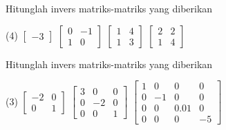 \begin{exercise}
Hitunglah invers matriks-matriks yang diberikan
\begin{tasks}(4)
\task
$\begin{bmatrix}
-3
\end{bmatrix}$
\task
$\begin{bmatrix}
0 & -1 \\
1 & 0
\end{bmatrix}$
\task
$\begin{bmatrix}
1 & 4 \\
1 & 3
\end{bmatrix}$
\task
$\begin{bmatrix}
2 & 2 \\
1 & 4
\end{bmatrix}$
\end{tasks}
\end{exercise}

\begin{exercise}
Hitunglah invers matriks-matriks yang diberikan
\begin{tasks}(3)
\task
$\begin{bmatrix}
-2 & 0 \\
0 & 1
\end{bmatrix}$
\task
$\begin{bmatrix}
3 & 0 & 0 \\
0 & -2 & 0 \\
0 & 0 & 1
\end{bmatrix}$
\task
$\begin{bmatrix}
1 & 0 & 0 & 0 \\
0 & -1 & 0 & 0 \\
0 & 0 & 0.01 & 0 \\
0 & 0 & 0 & -5
\end{bmatrix}$
\end{tasks}
\end{exercise}

\setcounter{exercise}{100}

